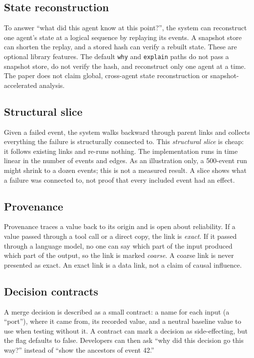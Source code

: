 \documentclass[11pt]{article}
\newcommand{\code}[1]{\textcolor{codegreen}{\texttt{#1}}}
\begin{document}
\subsection{State reconstruction}
To answer ``what did this agent know at this point?'', the system can reconstruct one agent's state at a logical sequence by replaying its events. A snapshot store can shorten the replay, and a stored hash can verify a rebuilt state. These are optional library features. The default \code{why} and \code{explain} paths do not pass a snapshot store, do not verify the hash, and reconstruct only one agent at a time. The paper does not claim global, cross-agent state reconstruction or snapshot-accelerated analysis.

\subsection{Structural slice}\label{sec:slice}
Given a failed event, the system walks backward through parent links and collects everything the failure is structurally connected to. This \emph{structural slice} is cheap: it follows existing links and re-runs nothing. The implementation runs in time linear in the number of events and edges. As an illustration only, a 500-event run might shrink to a dozen events; this is not a measured result. A slice shows what a failure was connected to, not proof that every included event had an effect.

\subsection{Provenance}\label{sec:provenance}
Provenance traces a value back to its origin and is open about reliability. If a value passed through a tool call or a direct copy, the link is \emph{exact}. If it passed through a language model, no one can say which part of the input produced which part of the output, so the link is marked \emph{coarse}. A coarse link is never presented as exact. An exact link is a data link, not a claim of causal influence.

\subsection{Decision contracts}\label{sec:contracts}
A merge decision is described as a small contract: a name for each input (a ``port''), where it came from, its recorded value, and a neutral baseline value to use when testing without it. A contract can mark a decision as side-effecting, but the flag defaults to false. Developers can then ask ``why did this decision go this way?'' instead of ``show the ancestors of event 42.''
\end{document}
